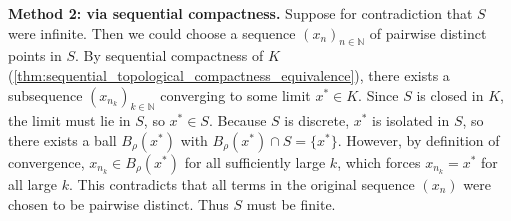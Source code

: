 \begin{exercisesolution}
\begin{enumerate}[label=\textbf{(\alph*)}]
    \textbf{Method 2: via sequential compactness.}
    Suppose for contradiction that $S$ were infinite. Then we could choose a sequence
    $(x_n)_{n \in \mathbb{N}}$ of pairwise distinct points in $S$.
    By sequential compactness of $K$ (\cref{thm:sequential_topological_compactness_equivalence}),
    there exists a subsequence $(x_{n_k})_{k \in \mathbb{N}}$ converging to some limit $x^* \in K$.
    Since $S$ is closed in $K$, the limit must lie in $S$, so $x^* \in S$.
    Because $S$ is discrete, $x^*$ is isolated in $S$, so there exists a ball $B_\rho(x^*)$ with
    $B_\rho(x^*) \cap S = \{x^*\}$.
    However, by definition of convergence, $x_{n_k} \in B_\rho(x^*)$ for all sufficiently large $k$,
    which forces $x_{n_k} = x^*$ for all large $k$.
    This contradicts that all terms in the original sequence $(x_n)$ were chosen to be pairwise distinct.
    Thus $S$ must be finite.
\end{enumerate}
\end{exercisesolution}


